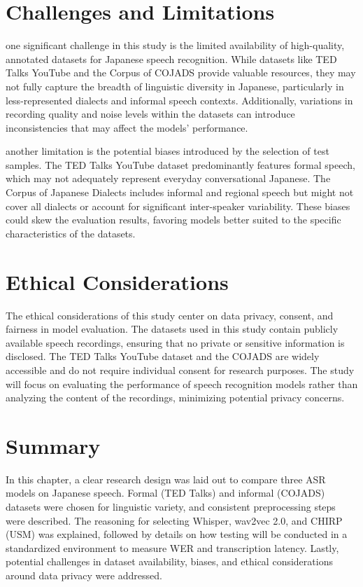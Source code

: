 \section{Challenges and Limitations}
one significant challenge in this study is the limited availability of high-quality, annotated datasets for Japanese speech recognition. While datasets like TED Talks YouTube and the Corpus of COJADS provide valuable resources, they may not fully capture the breadth of linguistic diversity in Japanese, particularly in less-represented dialects and informal speech contexts. Additionally, variations in recording quality and noise levels within the datasets can introduce inconsistencies that may affect the models’ performance.

another limitation is the potential biases introduced by the selection of test samples. The TED Talks YouTube dataset predominantly features formal speech, which may not adequately represent everyday conversational Japanese. The Corpus of Japanese Dialects includes informal and regional speech but might not cover all dialects or account for significant inter-speaker variability. These biases could skew the evaluation results, favoring models better suited to the specific characteristics of the datasets.

\section{Ethical Considerations}
The ethical considerations of this study center on data privacy, consent, and fairness in model evaluation. The datasets used in this study contain publicly available speech recordings, ensuring that no private or sensitive information is disclosed. The TED Talks YouTube dataset and the COJADS are widely accessible and do not require individual consent for research purposes. The study will focus on evaluating the performance of speech recognition models rather than analyzing the content of the recordings, minimizing potential privacy concerns.

\section{Summary}
In this chapter, a clear research design was laid out to compare three ASR models on Japanese speech. Formal (TED Talks) and informal (COJADS) datasets were chosen for linguistic variety, and consistent preprocessing steps were described. The reasoning for selecting Whisper, wav2vec 2.0, and CHIRP (USM) was explained, followed by details on how testing will be conducted in a standardized environment to measure WER and transcription latency. Lastly, potential challenges in dataset availability, biases, and ethical considerations around data privacy were addressed.